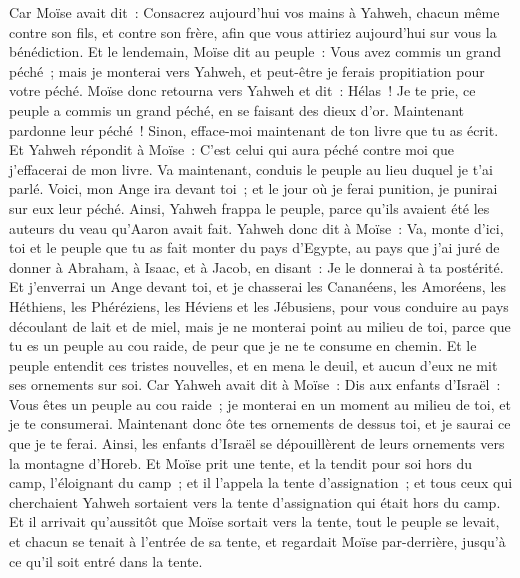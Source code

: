 \begin{multicols}{2}
Car Moïse avait dit~: Consacrez aujourd'hui vos mains à Yahweh, chacun même contre son fils, et contre son frère, afin que vous attiriez aujourd'hui sur vous la bénédiction.
Et le lendemain, Moïse dit au peuple~: Vous avez commis un grand péché~; mais je monterai vers Yahweh, et peut-être je ferais propitiation pour votre péché.
Moïse donc retourna vers Yahweh et dit~: Hélas~! Je te prie, ce peuple a commis un grand péché, en se faisant des dieux d'or.
Maintenant pardonne leur péché~! Sinon, efface-moi maintenant de ton livre que tu as écrit.
Et Yahweh répondit à Moïse~: C'est celui qui aura péché contre moi que j'effacerai de mon livre.
Va maintenant, conduis le peuple au lieu duquel je t'ai parlé. Voici, mon Ange ira devant toi~; et le jour où je ferai punition, je punirai sur eux leur péché.
 Ainsi, Yahweh frappa le peuple, parce qu'ils avaient été les auteurs du veau qu'Aaron avait fait.
\VerseOne{}Yahweh donc dit à Moïse~: Va, monte d'ici, toi et le peuple que tu as fait monter du pays d'Egypte, au pays que j'ai juré de donner à Abraham, à Isaac, et à Jacob, en disant~: Je le donnerai à ta postérité.
Et j'enverrai un Ange devant toi, et je chasserai les Cananéens, les Amoréens, les Héthiens, les Phéréziens, les Héviens et les Jébusiens,
pour vous conduire au pays découlant de lait et de miel, mais je ne monterai point au milieu de toi, parce que tu es un peuple au cou raide, de peur que je ne te consume en chemin.
Et le peuple entendit ces tristes nouvelles, et en mena le deuil, et aucun d'eux ne mit ses ornements sur soi.
Car Yahweh avait dit à Moïse~: Dis aux enfants d'Israël~: Vous êtes un peuple au cou raide~; je monterai en un moment au milieu de toi, et je te consumerai. Maintenant donc ôte tes ornements de dessus toi, et je saurai ce que je te ferai.
Ainsi, les enfants d'Israël se dépouillèrent de leurs ornements vers la montagne d'Horeb.
Et Moïse prit une tente, et la tendit pour soi hors du camp, l'éloignant du camp~; et il l'appela la tente d'assignation~; et tous ceux qui cherchaient Yahweh sortaient vers la tente d'assignation qui était hors du camp.
Et il arrivait qu'aussitôt que Moïse sortait vers la tente, tout le peuple se levait, et chacun se tenait à l'entrée de sa tente, et regardait Moïse par-derrière, jusqu'à ce qu'il soit entré dans la tente.

\end{multicols}
